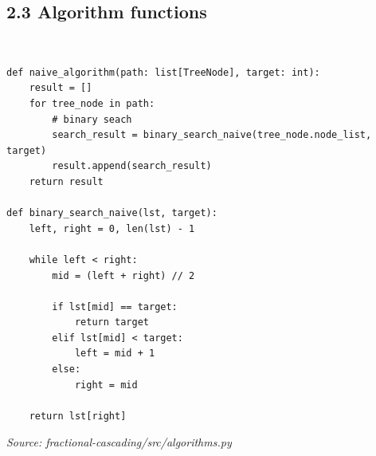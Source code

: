 \documentclass[12pt,english,]{article}
\begin{document}
\hypertarget{section2.3}{%
\subsection{\texorpdfstring{2.3 Algorithm functions}{2.3 Algorithm functions}}\label{section2.3}}

~

\begin{lstlisting}
def naive_algorithm(path: list[TreeNode], target: int):
    result = []
    for tree_node in path:
        # binary seach
        search_result = binary_search_naive(tree_node.node_list, target)
        result.append(search_result)
    return result

def binary_search_naive(lst, target):
    left, right = 0, len(lst) - 1

    while left < right:
        mid = (left + right) // 2

        if lst[mid] == target:
            return target
        elif lst[mid] < target:
            left = mid + 1
        else:
            right = mid

    return lst[right] 
\end{lstlisting}
\vspace{-9truemm}
\begin{minipage}{1\textwidth}
  \begin{flushright}
  {\footnotesize \emph{Source: fractional-cascading/src/algorithms.py }\par}
  \end{flushright}
\end{minipage}
\vspace{0.5truemm}

~
\end{document}
